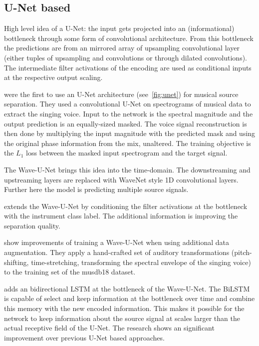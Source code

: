\subsection{U-Net based}
\begin{marginfigure}[-10em]
    \caption{High level idea of a U-Net: the input gets projected into an (informational) bottleneck through some form of convolutional architecture. From this bottleneck the predictions are from an mirrored array of upsampling convolutional layer (either tuples of upsampling and convolutions or through dilated convolutions). The intermediate filter activations of the encoding are used as conditional inputs at the respective output scaling.}%
    \label{fig:unet}
\end{marginfigure}

\textcite{janssonSinging2017} were the first to use an U-Net architecture (see~\cref{fig:unet}) for musical source separation. They used a convolutional U-Net on spectrograms of musical data to extract the singing voice. Input to the network is the spectral magnitude and the output prediction is an equally-sized masked. The voice signal reconstruction is then done by multiplying the input magnitude with the predicted mask and using the original phase information from the mix, unaltered. The training objective is the \(L_1\) loss between the masked input spectrogram and the target signal.

The Wave-U-Net\cite{stollerWaveUNet2018} brings this idea into the time-domain. The downstreaming and upstreaming layers are replaced with WaveNet style 1D convolutional layers. Further here the model is predicting multiple source signals.

\textcite{slizovskaiaEndtoEnd2019} extends the Wave-U-Net by conditioning the filter activations at the bottleneck with the instrument class label. The additional information is improving the separation quality.

\textcite{cohen-hadriaImproving2019} show improvements of training a Wave-U-Net when using additional data augmentation. They apply a hand-crafted set of auditory transformations (pitch-shifting, time-stretching, transforming the spectral envelope of the singing voice) to the training set of the musdb18 dataset.

\textcite{kaspersenHydraNet2019} adds an bidirectional LSTM at the bottleneck of the Wave-U-Net. The BiLSTM is capable of select and keep information at the bottleneck over time and combine this memory with the new encoded information. This makes it possible for the network to keep information about the source signal at scales larger than the actual receptive field of the U-Net. The research shows an significant improvement over previous U-Net based approaches.

